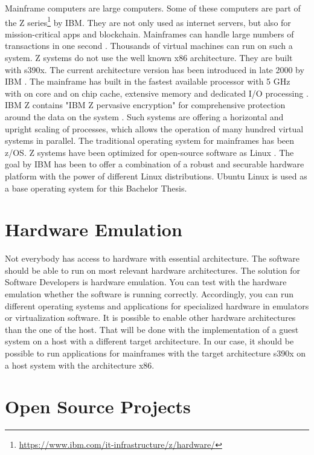 Mainframe computers are large computers. Some of these computers are part of the Z series\footnote{\url{https://www.ibm.com/it-infrastructure/z/hardware/}} by IBM. They are not only used as internet servers, but also for mission-critical apps and blockchain. 
Mainframes can handle large numbers of transactions in one second \cite[~p.56]{Tanenbaum2014}. 
Thousands of virtual machines can run on such a system. Z systems do not use the well known x86 architecture. 
They are built with s390x. The current architecture version has been introduced in late 2000 by IBM \cite[~p.15]{Block2019}. The mainframe has built in the fastest available processor with 5 GHz with on core and on chip cache, extensive memory and dedicated I/O processing \cite{OpenMainframeProject}.\\
IBM Z contains "IBM Z pervasive encryption" for comprehensive protection around the data on the system \cite[~p.4]{Lascu2020}. Such systems are offering a horizontal and upright \gls{scaling} of processes, which allows the operation of many hundred virtual systems in parallel\cite[~p.13]{Tschoeke2009}. The traditional operating system for mainframes has been z/OS. 
Z systems have been optimized for open-source software as Linux \cite[~p.8]{Lascu2020}. The goal by IBM has been to offer a combination of a robust and securable hardware platform with the power of different Linux distributions. 
Ubuntu Linux is used as a base operating system for this Bachelor Thesis.


\section{Hardware Emulation}

Not everybody has access to hardware with essential architecture. The software should be able to run on most relevant hardware architectures. The solution for Software Developers is hardware emulation. 
You can test with the hardware emulation whether the software is running correctly. 
Accordingly, you can run different operating systems and applications for specialized hardware in emulators or virtualization software. 
It is possible to enable other hardware architectures than the one of the host. 
That will be done with the implementation of a guest system on a host with a different target architecture\cite[~p.3]{Rosenthal2015}. In our case, it should be possible to run applications for mainframes with the target
architecture s390x on a host system with the architecture x86.


\section{Open Source Projects}

